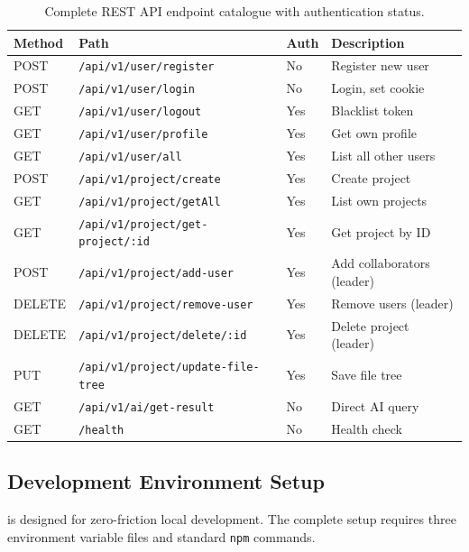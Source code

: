 \begin{table}[H]
  \centering
  \caption{Complete REST API endpoint catalogue with authentication status.}
  \label{tab:api}
  \begin{tabular}{lllp{4.5cm}}
    \toprule
    \textbf{Method} & \textbf{Path} & \textbf{Auth} & \textbf{Description} \\
    \midrule
    POST & \texttt{/api/v1/user/register}       & No  & Register new user \\
    POST & \texttt{/api/v1/user/login}           & No  & Login, set cookie \\
    GET  & \texttt{/api/v1/user/logout}          & Yes & Blacklist token \\
    GET  & \texttt{/api/v1/user/profile}         & Yes & Get own profile \\
    GET  & \texttt{/api/v1/user/all}             & Yes & List all other users \\
    POST & \texttt{/api/v1/project/create}       & Yes & Create project \\
    GET  & \texttt{/api/v1/project/getAll}       & Yes & List own projects \\
    GET  & \texttt{/api/v1/project/get-project/:id} & Yes & Get project by ID \\
    POST & \texttt{/api/v1/project/add-user}     & Yes & Add collaborators (leader) \\
    DELETE & \texttt{/api/v1/project/remove-user} & Yes & Remove users (leader) \\
    DELETE & \texttt{/api/v1/project/delete/:id} & Yes & Delete project (leader) \\
    PUT  & \texttt{/api/v1/project/update-file-tree} & Yes & Save file tree \\
    GET  & \texttt{/api/v1/ai/get-result}        & No  & Direct AI query \\
    GET  & \texttt{/health}                      & No  & Health check \\
    \bottomrule
  \end{tabular}
\end{table}

\subsection{Development Environment Setup}
\label{sub:devsetup}

\echoray{} is designed for zero-friction local development. The complete setup
requires three environment variable files and standard \texttt{npm} commands.

